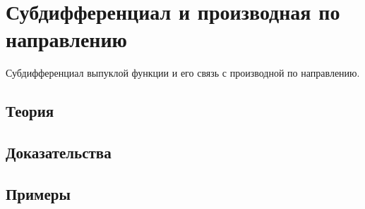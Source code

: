 
\section{Субдифференциал и производная по направлению}
\label{sec:2.4.05-subdifferential}

\begin{ticket}
Субдифференциал выпуклой функции и его связь с производной по направлению.
\end{ticket}

\subsection*{Теория}

\subsection*{Доказательства}

\subsection*{Примеры}
